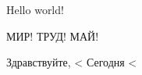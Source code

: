 \documentclass[12pt]{article}
\begin{document}
Hello world!

МИР! ТРУД! МАЙ!

Здравствуйте, <%
Сегодня <%
\end{document}
